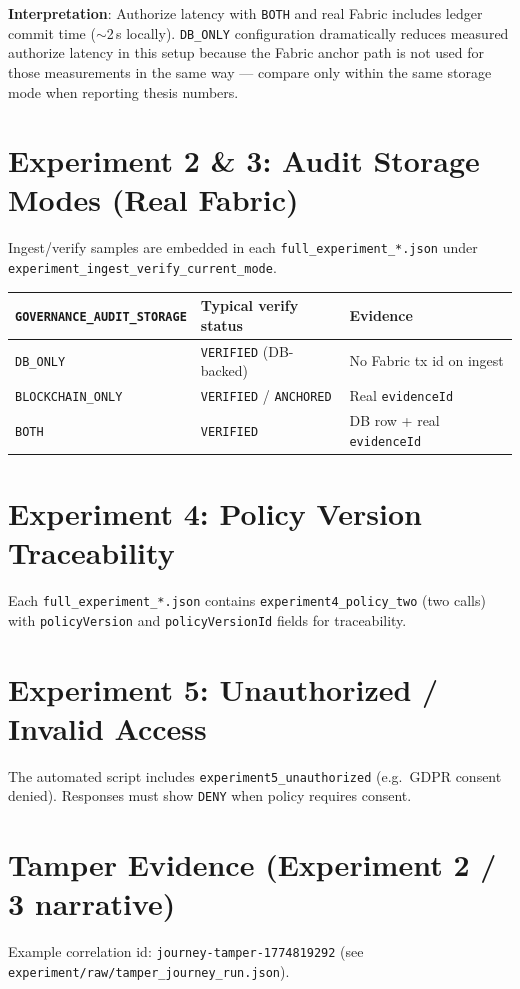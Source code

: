 \documentclass[11pt]{article}
\begin{document}
\textbf{Interpretation}: Authorize latency with \texttt{BOTH} and real Fabric includes ledger commit time ($\sim$2\,s locally). \texttt{DB\_ONLY} configuration dramatically reduces measured authorize latency in this setup because the Fabric anchor path is not used for those measurements in the same way --- compare only within the same storage mode when reporting thesis numbers.

\section{Experiment 2 \& 3: Audit Storage Modes (Real Fabric)}
Ingest/verify samples are embedded in each \texttt{full\_experiment\_*.json} under \texttt{experiment\_ingest\_verify\_current\_mode}.

\begin{longtable}{p{3.5cm}p{4cm}p{5.5cm}}
\toprule
\texttt{GOVERNANCE\_AUDIT\_STORAGE} & Typical verify status & Evidence \\
\midrule
\texttt{DB\_ONLY} & \texttt{VERIFIED} (DB-backed) & No Fabric tx id on ingest \\
\texttt{BLOCKCHAIN\_ONLY} & \texttt{VERIFIED} / \texttt{ANCHORED} & Real \texttt{evidenceId} \\
\texttt{BOTH} & \texttt{VERIFIED} & DB row + real \texttt{evidenceId} \\
\bottomrule
\end{longtable}

\section{Experiment 4: Policy Version Traceability}
Each \texttt{full\_experiment\_*.json} contains \texttt{experiment4\_policy\_two} (two calls) with \texttt{policyVersion} and \texttt{policyVersionId} fields for traceability.

\section{Experiment 5: Unauthorized / Invalid Access}
The automated script includes \texttt{experiment5\_unauthorized} (e.g.\ GDPR consent denied). Responses must show \texttt{DENY} when policy requires consent.

\section{Tamper Evidence (Experiment 2 / 3 narrative)}
Example correlation id: \texttt{journey-tamper-1774819292} (see \texttt{experiment/raw/tamper\_journey\_run.json}).
\end{document}
